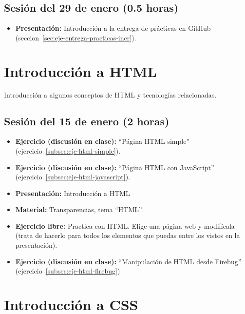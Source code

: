 \documentclass[a4paper,12pt]{report}
\begin{document}
\subsection{Sesión del 29 de enero (0.5 horas)}

\begin{itemize}
\item \textbf{Presentación:} Introducción a la entrega de prácticas en GitHub (seccion~\ref{sec:eje-entrega-practicas-incr}).
\end{itemize}



\section{Introducción a HTML}

Introducción a algunos conceptos de HTML y tecnologías relacionadas.

\subsection{Sesión del 15 de enero (2 horas)}

\begin{itemize}
\item \textbf{Ejercicio (discusión en clase):} ``Página HTML simple'' (ejercicio~\ref{subsec:eje-html-simple}).
\item \textbf{Ejercicio (discusión en clase):} ``Página HTML con JavaScript'' (ejercicio~\ref{subsec:eje-html-javascript}).
\item \textbf{Presentación:} Introducción a HTML
\item \textbf{Material:} Transparencias, tema ``HTML''.
\item \textbf{Ejercicio libre:} Practica con HTML. Elige una página web y modifícala (trata de hacerlo para todos los elementos que puedas entre los vistos en la presentación).
\item \textbf{Ejercicio (discusión en clase):} ``Manipulación de HTML desde Firebug'' (ejercicio~\ref{subsec:eje-html-firebug})
\end{itemize}


\section{Introducción a CSS}
\end{document}
